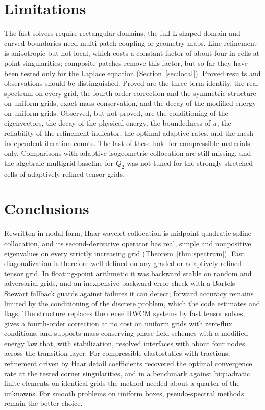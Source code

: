 \documentclass[preprint,12pt]{elsarticle}
\theoremstyle{remark}
\begin{document}
\section{Limitations}\label{sec:limits}
The fast solvers require rectangular domains; the full L-shaped domain and curved boundaries need
multi-patch coupling or geometry maps. Line refinement is anisotropic but not local, which costs a
constant factor of about four in cells at point singularities; composite patches remove this factor, but
so far they have been tested only for the Laplace equation (Section~\ref{sec:local}). Proved results and observations should be
distinguished. Proved are the three-term identity, the real spectrum on every grid, the fourth-order
correction and the symmetric structure on uniform grids, exact mass conservation, and the decay of the
modified energy on uniform grids. Observed, but not proved, are the conditioning of the eigenvectors, the
decay of the physical energy, the boundedness of $u$, the reliability of the refinement indicator, the
optimal adaptive rates, and the mesh-independent iteration counts. The last of these hold for compressible
materials only. Comparisons with adaptive isogeometric collocation are still missing, and the algebraic-multigrid
baseline for $Q_2$ was not tuned for the strongly stretched cells of adaptively refined tensor grids.

\section{Conclusions}
Rewritten in nodal form, Haar wavelet collocation is midpoint quadratic-spline collocation, and its
second-derivative operator has real, simple and nonpositive eigenvalues on every strictly increasing grid
(Theorem~\ref{thm:spectrum}). Fast diagonalization is therefore well defined on any graded or adaptively
refined tensor grid. In floating-point arithmetic it was backward stable on random and adversarial grids,
and an inexpensive backward-error check with a Bartels--Stewart fallback guards against failures it can
detect; forward accuracy remains limited by the conditioning of the discrete problem, which the code
estimates and flags. The structure replaces the dense HWCM systems by fast tensor solves, gives a
fourth-order correction at no cost on uniform grids with zero-flux conditions, and supports
mass-conserving phase-field schemes with a modified energy law that, with stabilization, resolved
interfaces with about four nodes across the transition layer. For compressible elastostatics with
tractions, refinement driven by Haar detail coefficients recovered the optimal convergence rate at the
tested corner singularities, and in a benchmark against biquadratic finite elements on identical grids the
method needed about a quarter of the unknowns. For smooth problems on uniform boxes, pseudo-spectral
methods remain the better choice.
\end{document}
